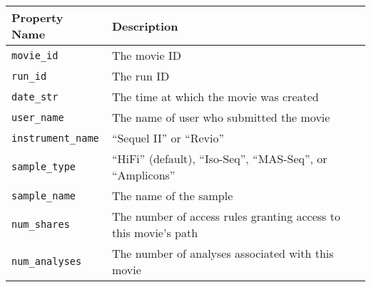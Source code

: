 \begin{tabularx}{\textwidth}{l|X}
\hline
 Property Name   & Description                                                     \\
\hline
 \texttt{movie\_id}        & The movie ID                                                    \\
 \texttt{run\_id}          & The run ID                                                      \\
 \texttt{date\_str}        & The time at which the movie was created                         \\
 \texttt{user\_name}       & The name of user who submitted the movie                        \\
 \texttt{instrument\_name} & ``Sequel II'' or ``Revio''                                      \\
 \texttt{sample\_type}     & ``HiFi'' (default), ``Iso-Seq'', ``MAS-Seq'', or ``Amplicons''  \\
 \texttt{sample\_name}     & The name of the sample                                          \\
 \texttt{num\_shares}      & The number of access rules granting access to this movie's path \\
 \texttt{num\_analyses}    & The number of analyses associated with this movie               \\
\hline
\end{tabularx}